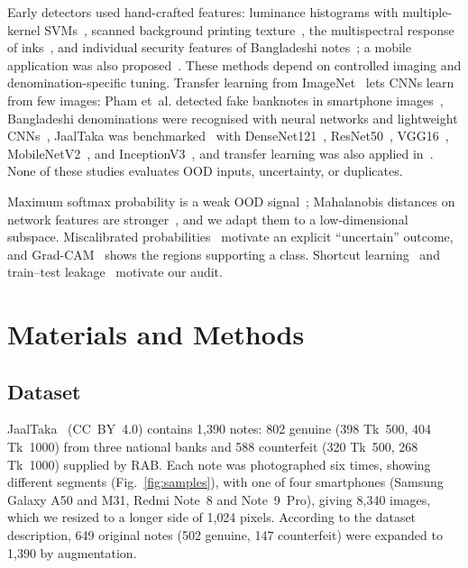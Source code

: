 \documentclass[pdflatex,sn-mathphys-num]{sn-jnl}
\begin{document}
Early detectors used hand-crafted features: luminance histograms with multiple-kernel
SVMs~\cite{yeh2011}, scanned background printing texture~\cite{berenguel2016}, the
multispectral response of inks~\cite{baek2018}, and individual security features of
Bangladeshi notes~\cite{uddin2016}; a mobile application was also
proposed~\cite{dittimi2018}. These methods depend on controlled imaging and
denomination-specific tuning. Transfer learning from
ImageNet~\cite{deng2009imagenet,yosinski2014transferable} lets CNNs learn from few
images: Pham et~al. detected fake banknotes in smartphone images~\cite{pham2020,pham2022},
Bangladeshi denominations were recognised with neural networks and lightweight
CNNs~\cite{jahangir2007,linkon2020}, JaalTaka was benchmarked~\cite{piyas2025jaaltaka}
with DenseNet121~\cite{huang2017densenet}, ResNet50~\cite{he2016resnet},
VGG16~\cite{simonyan2015vgg}, MobileNetV2~\cite{sandler2018mobilenetv2}, and
InceptionV3~\cite{szegedy2016inception}, and transfer learning was also applied
in~\cite{tabassum2025}. None of these studies evaluates OOD inputs, uncertainty, or
duplicates.

Maximum softmax probability is a weak OOD signal~\cite{hendrycks2017baseline};
Mahalanobis distances on network features are stronger~\cite{lee2018mahalanobis}, and we
adapt them to a low-dimensional subspace. Miscalibrated
probabilities~\cite{guo2017calibration} motivate an explicit ``uncertain'' outcome, and
Grad-CAM~\cite{selvaraju2017gradcam} shows the regions supporting a class. Shortcut
learning~\cite{geirhos2020shortcut} and train--test leakage~\cite{kapoor2023leakage}
motivate our audit.

\section{Materials and Methods}\label{sec:method}

\subsection{Dataset}\label{sec:data}

JaalTaka~\cite{piyas2025jaaltaka,jaaltaka_data} (CC~BY~4.0) contains 1{,}390 notes:
802 genuine (398 Tk~500, 404 Tk~1000) from three national banks and 588 counterfeit
(320 Tk~500, 268 Tk~1000) supplied by RAB. Each note was photographed six times, showing
different segments (Fig.~\ref{fig:samples}), with one of four smartphones (Samsung Galaxy
A50 and M31, Redmi Note~8 and Note~9~Pro), giving 8{,}340 images, which we resized to a
longer side of 1{,}024 pixels. According to the dataset description, 649 original notes
(502 genuine, 147 counterfeit) were expanded to 1{,}390 by augmentation.
\end{document}
